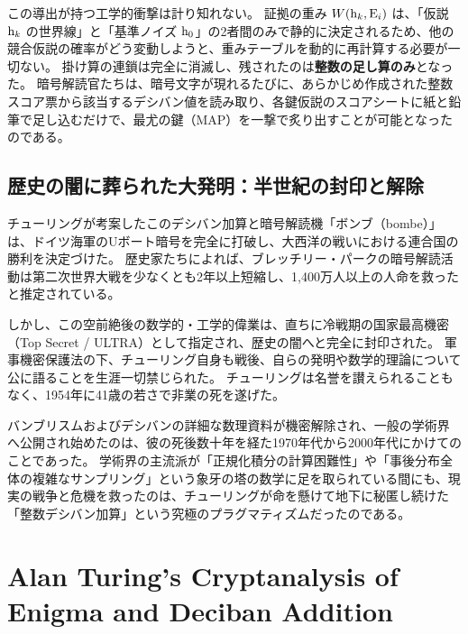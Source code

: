     この導出が持つ工学的衝撃は計り知れない。
    証拠の重み $W(\mathrm{h}_{k}, \mathrm{E}_{i})$ は、「仮説 $\mathrm{h}_{k}$ の世界線」と「基準ノイズ $\mathrm{h}_0$」の2者間のみで静的に決定されるため、他の競合仮説の確率がどう変動しようと、重みテーブルを動的に再計算する必要が一切ない。
    掛け算の連鎖は完全に消滅し、残されたのは\textbf{整数の足し算のみ}となった。
    暗号解読官たちは、暗号文字が現れるたびに、あらかじめ作成された整数スコア票から該当するデシバン値を読み取り、各鍵仮説のスコアシートに紙と鉛筆で足し込むだけで、最尤の鍵（MAP）を一撃で炙り出すことが可能となったのである。

    \subsection{歴史の闇に葬られた大発明：半世紀の封印と解除}
    チューリングが考案したこのデシバン加算と暗号解読機「ボンブ（bombe）」は、ドイツ海軍のUボート暗号を完全に打破し、大西洋の戦いにおける連合国の勝利を決定づけた。
    歴史家たちによれば、ブレッチリー・パークの暗号解読活動は第二次世界大戦を少なくとも2年以上短縮し、1,400万人以上の人命を救ったと推定されている。

    しかし、この空前絶後の数学的・工学的偉業は、直ちに冷戦期の国家最高機密（Top Secret / ULTRA）として指定され、歴史の闇へと完全に封印された。
    軍事機密保護法の下、チューリング自身も戦後、自らの発明や数学的理論について公に語ることを生涯一切禁じられた。
    チューリングは名誉を讃えられることもなく、1954年に41歳の若さで非業の死を遂げた。

    バンブリスムおよびデシバンの詳細な数理資料が機密解除され、一般の学術界へ公開され始めたのは、彼の死後数十年を経た1970年代から2000年代にかけてのことであった。
    学術界の主流派が「正規化積分の計算困難性」や「事後分布全体の複雑なサンプリング」という象牙の塔の数学に足を取られている間にも、現実の戦争と危機を救ったのは、チューリングが命を懸けて地下に秘匿し続けた「整数デシバン加算」という究極のプラグマティズムだったのである。

\else
    \section{Alan Turing's Cryptanalysis of Enigma and Deciban Addition}

